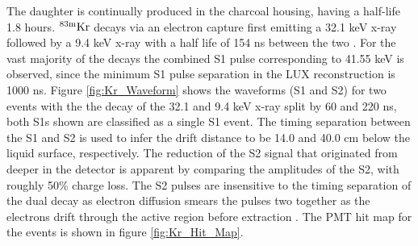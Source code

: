 \noindent The daughter \KrCal is continually produced in the charcoal housing, having a half-life 1.8 hours. $\rm^{83m}Kr$ decays via an electron capture first emitting a 32.1 keV x-ray followed by a 9.4 keV x-ray with a half life of 154 ns between the two \cite{Start_Kr} \cite{Kastens}.  For the vast majority of the decays the combined S1 pulse corresponding to 41.55 keV is observed, since the minimum S1 pulse separation in the LUX reconstruction is 1000 ns. Figure \ref{fig:Kr_Waveform} shows the waveforms (S1 and S2) for two  \KrCal events with the the decay of the 32.1 and 9.4 keV x-ray split by 60 and 220 ns, both S1s shown are classified as a single S1 event. The timing separation between the S1 and S2 is used to infer the drift distance to be 14.0 and 40.0 cm below the liquid surface, respectively. The reduction of the S2 signal that originated from deeper in the detector is apparent by comparing the amplitudes of the S2, with roughly 50\% charge loss. The S2 pulses are insensitive to the timing separation of the dual decay as electron diffusion smears the pulses two together as the electrons drift through the active region before extraction \cite{Electron_Diffusion}. The PMT hit map for the events is shown in figure \ref{fig:Kr_Hit_Map}.


